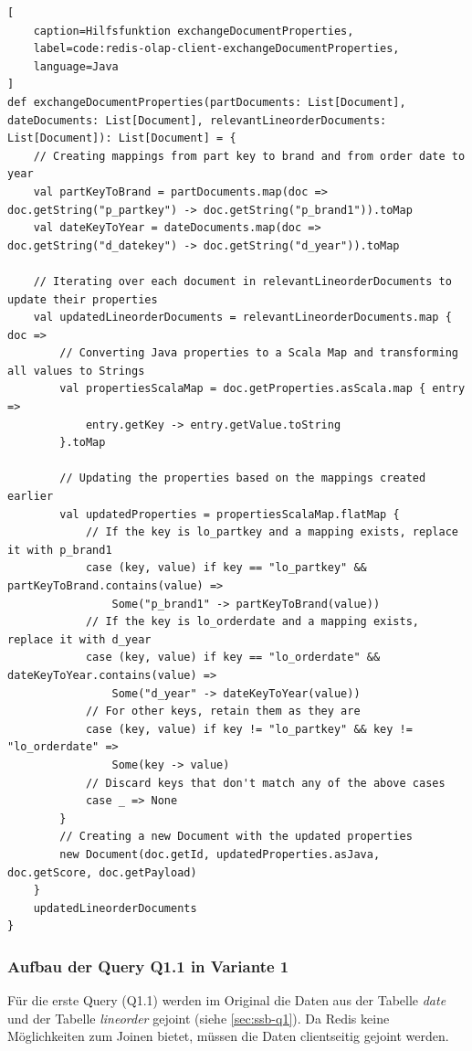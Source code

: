\begin{lstlisting}[
    caption=Hilfsfunktion exchangeDocumentProperties,
    label=code:redis-olap-client-exchangeDocumentProperties,
    language=Java
]
def exchangeDocumentProperties(partDocuments: List[Document], dateDocuments: List[Document], relevantLineorderDocuments: List[Document]): List[Document] = {
	// Creating mappings from part key to brand and from order date to year
	val partKeyToBrand = partDocuments.map(doc => doc.getString("p_partkey") -> doc.getString("p_brand1")).toMap
	val dateKeyToYear = dateDocuments.map(doc => doc.getString("d_datekey") -> doc.getString("d_year")).toMap

	// Iterating over each document in relevantLineorderDocuments to update their properties
	val updatedLineorderDocuments = relevantLineorderDocuments.map { doc =>
		// Converting Java properties to a Scala Map and transforming all values to Strings
		val propertiesScalaMap = doc.getProperties.asScala.map { entry =>
			entry.getKey -> entry.getValue.toString
		}.toMap

		// Updating the properties based on the mappings created earlier
		val updatedProperties = propertiesScalaMap.flatMap {
			// If the key is lo_partkey and a mapping exists, replace it with p_brand1
			case (key, value) if key == "lo_partkey" && partKeyToBrand.contains(value) =>
				Some("p_brand1" -> partKeyToBrand(value))
			// If the key is lo_orderdate and a mapping exists, replace it with d_year
			case (key, value) if key == "lo_orderdate" && dateKeyToYear.contains(value) =>
				Some("d_year" -> dateKeyToYear(value))
			// For other keys, retain them as they are
			case (key, value) if key != "lo_partkey" && key != "lo_orderdate" =>
				Some(key -> value)
			// Discard keys that don't match any of the above cases
			case _ => None
		}
		// Creating a new Document with the updated properties
		new Document(doc.getId, updatedProperties.asJava, doc.getScore, doc.getPayload)
	}
	updatedLineorderDocuments
}
\end{lstlisting}
\subsubsection{Aufbau der Query Q1.1 in Variante 1}
Für die erste Query (Q1.1) werden im Original die Daten aus der Tabelle \emph{date} und der Tabelle \emph{lineorder} gejoint (siehe \cref{sec:ssb-q1}). Da Redis keine Möglichkeiten zum Joinen bietet, müssen die Daten clientseitig gejoint werden.

